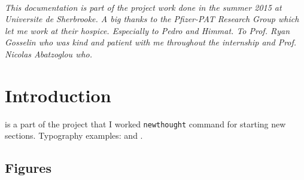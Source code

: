 \documentclass{tufte-book} %
\begin{document}

\listoftables %


\cleardoublepage
~\vfill
\begin{doublespace}
\noindent\fontsize{18}{22}\selectfont\itshape
\nohyphenation
This documentation is part of the project work done in the summer 2015 at Universite de Sherbrooke. A big thanks to the Pfizer-PAT Research Group which let me work at their hospice. Especially to Pedro and Himmat. To Prof. Ryan Gosselin who was kind and patient with me throughout the internship and Prof. Nicolas Abatzoglou who.
\end{doublespace}
\vfill
\vfill


\cleardoublepage
\chapter{Introduction} %
\label{ch:0}

 is a part of the project that I worked \texttt{newthought} command for starting new sections. Typography examples:  and .


\section{Figures}

\lipsum[1] 
\end{document}
